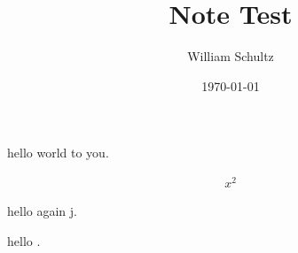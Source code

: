 \documentclass[10pt]{article}
\begin{document}
\title{Note Test}
\author{William Schultz}
\date{\today}

\maketitle
\tableofcontents
hello world to you.

\begin{align}
    x^2
\end{align}

hello again j.

hello \cite{2021Ebbinghaus}.




\end{document}
